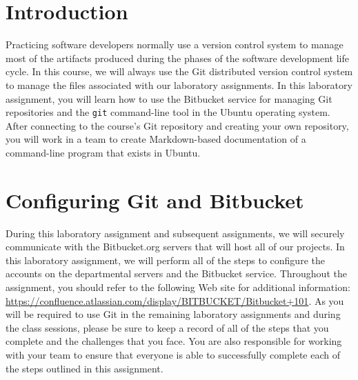 

\usepackage[compact]{titlesec}



\section*{Introduction}

Practicing software developers normally use a version control system to manage most of the artifacts produced during the
phases of the software development life cycle.  In this course, we will always use the Git distributed version control
system to manage the files associated with our laboratory assignments.  In this laboratory assignment, you will learn
how to use the Bitbucket service for managing Git repositories and the {\tt git} command-line tool in the Ubuntu
operating system. After connecting to the course's Git repository and creating your own repository, you will work in a
team to create Markdown-based documentation of a command-line program that exists in Ubuntu.

\section*{Configuring Git and Bitbucket}

During this laboratory assignment and subsequent assignments, we will securely communicate with the Bitbucket.org
servers that will host all of our projects.  In this laboratory assignment, we will perform all of the steps to
configure the accounts on the departmental servers and the Bitbucket service.  Throughout the assignment, you should
refer to the following Web site for additional information:
\url{https://confluence.atlassian.com/display/BITBUCKET/Bitbucket+101}.  As you will be required to use Git in the
remaining laboratory assignments and during the class sessions, please be sure to keep a record of all of the steps that
you complete and the challenges that you face.  You are also responsible for working with your team to ensure that
everyone is able to successfully complete each of the steps outlined in this assignment.

